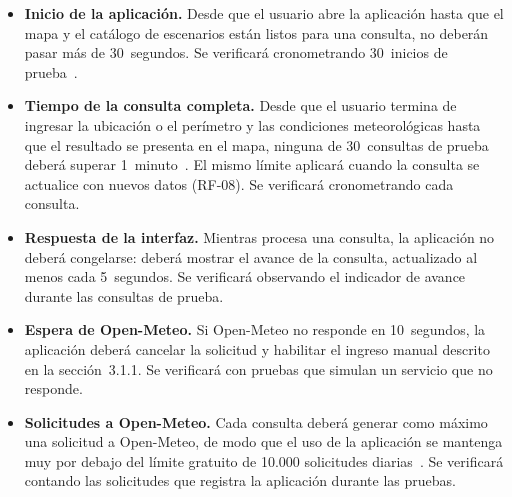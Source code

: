 \begin{itemize}
  \item \textbf{Inicio de la aplicación.} Desde que el usuario abre la aplicación hasta que el mapa y el catálogo de escenarios están listos para una consulta, no deberán pasar más de 30~segundos. Se verificará cronometrando 30~inicios de prueba~\cite{vitoriano2021probabilidad}.
  \item \textbf{Tiempo de la consulta completa.} Desde que el usuario termina de ingresar la ubicación o el perímetro y las condiciones meteorológicas hasta que el resultado se presenta en el mapa, ninguna de 30~consultas de prueba~\cite{vitoriano2021probabilidad} deberá superar 1~minuto~\cite{pmp2026}. El mismo límite aplicará cuando la consulta se actualice con nuevos datos (RF-08). Se verificará cronometrando cada consulta.
  \item \textbf{Respuesta de la interfaz.} Mientras procesa una consulta, la aplicación no deberá congelarse: deberá mostrar el avance de la consulta, actualizado al menos cada 5~segundos. Se verificará observando el indicador de avance durante las consultas de prueba.
  \item \textbf{Espera de Open-Meteo.} Si Open-Meteo no responde en 10~segundos, la aplicación deberá cancelar la solicitud y habilitar el ingreso manual descrito en la sección~3.1.1. Se verificará con pruebas que simulan un servicio que no responde.
  \item \textbf{Solicitudes a Open-Meteo.} Cada consulta deberá generar como máximo una solicitud a Open-Meteo, de modo que el uso de la aplicación se mantenga muy por debajo del límite gratuito de 10.000 solicitudes diarias~\cite{openmeteoterms}. Se verificará contando las solicitudes que registra la aplicación durante las pruebas.
\end{itemize}